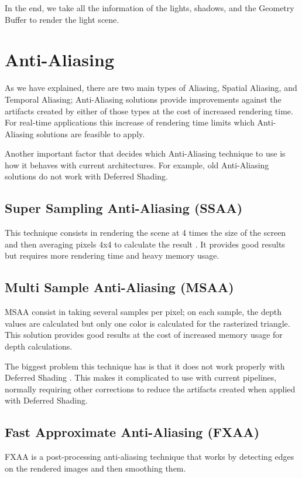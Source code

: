 \documentclass{cslthse-msc}
\begin{document}
In the end, we take all the information of the lights, shadows, and the Geometry Buffer to render the light scene.




\section{Anti-Aliasing}
As we have explained, there are two main types of Aliasing, Spatial Aliasing, and Temporal Aliasing; Anti-Aliasing solutions provide improvements against the artifacts created by either of those types at the cost of increased rendering time. For real-time applications this increase of rendering time limits which Anti-Aliasing solutions are feasible to apply.

Another important factor that decides which Anti-Aliasing technique to use is how it behaves with current architectures. For example, old Anti-Aliasing solutions do not work with Deferred Shading.

\subsection{Super Sampling Anti-Aliasing (SSAA)}
This technique consists in rendering the scene at 4 times the size of the screen and then averaging pixels 4x4 to calculate the result \cite{Doggett2017EDAN35}. It provides good results but requires more rendering time and heavy memory usage.

\subsection{Multi Sample Anti-Aliasing (MSAA)}
MSAA consist in taking several samples per pixel; on each sample, the depth values are calculated but only one color is calculated for the rasterized triangle. This solution provides good results at the cost of increased memory usage for depth calculations. 

The biggest problem this technique has is that it does not work properly with Deferred Shading \cite{Doggett2017EDAN35}. This makes it complicated to use with current pipelines, normally requiring other corrections to reduce the artifacts created when applied with Deferred Shading.

\subsection{Fast Approximate Anti-Aliasing (FXAA)}
FXAA is a post-processing anti-aliasing technique that works by detecting edges on the rendered images and then smoothing them. \cite{Lottes2009}
\end{document}
